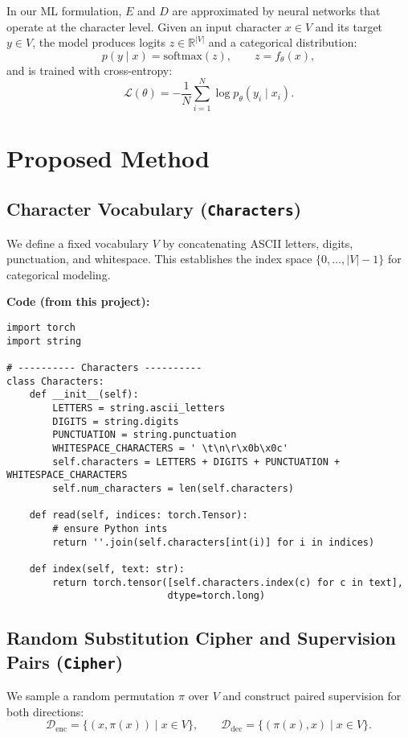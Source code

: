 \documentclass[12pt]{article}
\begin{document}
In our ML formulation, $E$ and $D$ are approximated by neural networks that operate at the character level. 
Given an input character $x\in V$ and its target $y\in V$, the model produces logits $z\in\mathbb{R}^{|V|}$ and a categorical distribution:
\begin{equation}
p(y\mid x) = \mathrm{softmax}(z), \qquad z = f_\theta(x),
\end{equation}
and is trained with cross-entropy:
\begin{equation}
\mathcal{L}(\theta)= -\frac{1}{N}\sum_{i=1}^{N}\log p_\theta(y_i\mid x_i).
\end{equation}

\section{Proposed Method}

\subsection{Character Vocabulary (\texttt{Characters})}
We define a fixed vocabulary $V$ by concatenating ASCII letters, digits, punctuation, and whitespace. 
This establishes the index space $\{0,\dots,|V|-1\}$ for categorical modeling.

\noindent\textbf{Code (from this project):}
\begin{verbatim}
import torch
import string

# ---------- Characters ----------
class Characters:
    def __init__(self):
        LETTERS = string.ascii_letters
        DIGITS = string.digits
        PUNCTUATION = string.punctuation
        WHITESPACE_CHARACTERS = ' \t\n\r\x0b\x0c'
        self.characters = LETTERS + DIGITS + PUNCTUATION + WHITESPACE_CHARACTERS
        self.num_characters = len(self.characters)

    def read(self, indices: torch.Tensor):
        # ensure Python ints
        return ''.join(self.characters[int(i)] for i in indices)

    def index(self, text: str):
        return torch.tensor([self.characters.index(c) for c in text],
                            dtype=torch.long)
\end{verbatim}

\subsection{Random Substitution Cipher and Supervision Pairs (\texttt{Cipher})}
We sample a random permutation $\pi$ over $V$ and construct paired supervision for both directions:
\[
\mathcal{D}_{\mathrm{enc}}=\{(x,\pi(x))\mid x\in V\}, \qquad
\mathcal{D}_{\mathrm{dec}}=\{(\pi(x),x)\mid x\in V\}.
\]
\end{document}
